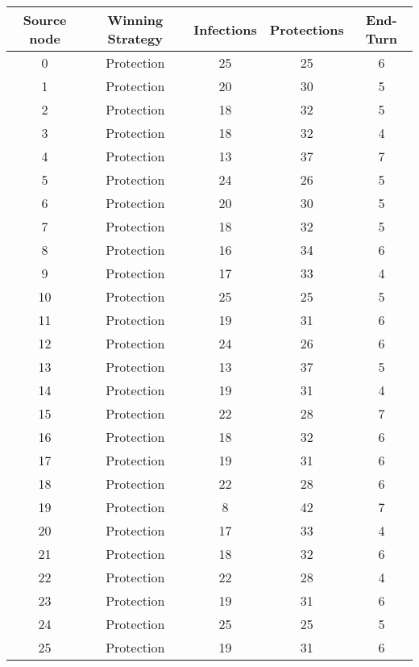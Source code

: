 \documentclass[results.tex]{subfiles}
\begin{document}
\begin{center}
  \begin{tabular}{| c || c | c | c | c |}
    \hline
    {\bfseries Source node} & {\bfseries Winning Strategy} & {\bfseries Infections} & {\bfseries Protections} & {\bfseries End-Turn} \\  %
    \hline\hline
    0 & Protection & 25 & 25 & 6 \\ 
    \hline
    1 & Protection & 20 & 30 & 5 \\ 
    \hline
    2 & Protection & 18 & 32 & 5 \\ 
    \hline
    3 & Protection & 18 & 32 & 4 \\ 
    \hline
    4 & Protection & 13 & 37 & 7 \\ 
    \hline
    5 & Protection & 24 & 26 & 5 \\ 
    \hline
    6 & Protection & 20 & 30 & 5 \\ 
    \hline
    7 & Protection & 18 & 32 & 5 \\ 
    \hline
    8 & Protection & 16 & 34 & 6 \\ 
    \hline
    9 & Protection & 17 & 33 & 4 \\ 
    \hline
    10 & Protection & 25 & 25 & 5 \\ 
    \hline
    11 & Protection & 19 & 31 & 6 \\ 
    \hline
    12 & Protection & 24 & 26 & 6 \\ 
    \hline
    13 & Protection & 13 & 37 & 5 \\ 
    \hline
    14 & Protection & 19 & 31 & 4 \\ 
    \hline
    15 & Protection & 22 & 28 & 7 \\ 
    \hline
    16 & Protection & 18 & 32 & 6 \\ 
    \hline
    17 & Protection & 19 & 31 & 6 \\ 
    \hline
    18 & Protection & 22 & 28 & 6 \\ 
    \hline
    19 & Protection & 8 & 42 & 7 \\ 
    \hline
    20 & Protection & 17 & 33 & 4 \\ 
    \hline
    21 & Protection & 18 & 32 & 6 \\ 
    \hline
    22 & Protection & 22 & 28 & 4 \\ 
    \hline
    23 & Protection & 19 & 31 & 6 \\ 
    \hline
    24 & Protection & 25 & 25 & 5 \\ 
    \hline
    25 & Protection & 19 & 31 & 6 \\ 

\end{tabular}
\end{center}
\end{document}
